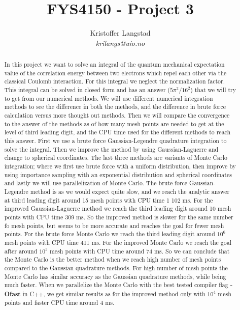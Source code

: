 \documentclass[12pt,a4paper,english]{article}
\title{FYS4150 - Project 3}
\date{}
\author{ Kristoffer Langstad\\ \textit{krilangs@uio.no}}
\begin{document}
\maketitle
\begin{abstract}
In this project we want to solve an integral of the quantum mechanical expectation value of the correlation energy between two electrons which repel each other via the classical Coulomb interaction. For this integral we neglect the normalization factor. This integral can be solved in closed form and has an answer ($5\pi^2/16^2$) that we will try to get from our numerical methods. We will use different numerical integration methods to see the difference in both the methods, and the difference in brute force calculation versus more thought out methods. Then we will compare the convergence to the answer of the methods as of how many mesh points are needed to get at the level of third leading digit, and the CPU time used for the different methods to reach this answer. First we use a brute force Gaussian-Legendre quadrature integration to solve the integral. Then we improve the method by using Gaussian-Laguerre and change to spherical coordinates. The last three methods are variants of Monte Carlo integration; where we first use brute force with a uniform distribution, then improve by using importance sampling with an exponential distribution and spherical coordinates and lastly we will use parallelization of Monte Carlo. The brute force Gaussian-Legendre method is as we would expect quite slow, and we reach the analytic answer at third leading digit around 15 mesh points with CPU time 1 102 ms. For the improved Gaussian-Laguerre method we reach the third leading digit around 10 mesh points with CPU time 309 ms. So the improved method is slower for the same number fo mesh points, but seems to be more accurate and reaches the goal for fewer mesh points. For the brute force Monte Carlo we reach the third leading digit around $10^6$ mesh points with CPU time 411 ms. For the improved Monte Carlo we reach the goal after around $10^5$ mesh points with CPU time around 74 ms. So we can conclude that the Monte Carlo is the better method when we reach high number of mesh points compared to the Gaussian quadrature methods. For high number of mesh points the Monte Carlo has similar accuracy as the Gaussian quadrature methods, while being much faster. When we parallelize the Monte Carlo with the best tested compiler flag \textbf{-Ofast} in C++, we get similar results as for the improved method only with $10^4$ mesh points and faster CPU time around 4 ms.
\end{abstract}
\end{document}
